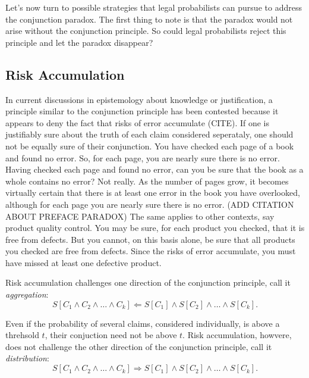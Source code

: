 \documentclass[10pt,dvipsnames,enabledeprecatedfontcommands]{scrartcl}
\begin{document}
Let's now turn to possible strategies that legal probabilists can pursue
to address the conjunction paradox. The first thing to note is that the
paradox would not arise without the conjunction principle. So could
legal probabilists reject this principle and let the paradox disappear?

\hypertarget{risk-accumulation}{%
\subsection{Risk Accumulation}\label{risk-accumulation}}

In current discussions in epistemology about knowledge or justification,
a principle similar to the conjunction principle has been contested
because it appears to deny the fact that risks of error accumulate
(CITE).
If one is justifiably sure about the truth of each claim considered
seperataly, one should not be equally sure of their conjunction. You
have checked each page of a book and found no error. So, for each page,
you are nearly sure there is no error. Having checked each page and
found no error, can you be sure that the book as a whole contains no
error? Not really. As the number of pages grow, it becomes virtually
certain that there is at least one error in the book you have
overlooked, although for each page you are nearly sure there is no
error. (ADD CITATION ABOUT PREFACE PARADOX) The same applies to other
contexts, say product quality control. You may be sure, for each product
you checked, that it is free from defects. But you cannot, on this basis
alone, be sure that all products you checked are free from defects.
Since the risks of error accumulate, you must have missed at least one
defective product.

Risk accumulation challenges one direction of the conjunction principle,
call it \textit{aggregation}:
\[S[C_1 \wedge C_2  \wedge \dots \wedge  C_k] \Leftarrow S[C_1] \wedge S[C_2]  \wedge \dots \wedge  S[C_k].\]

\noindent Even if the probability of several claims, considered
individually, is above a threhsold \(t\), their conjuction need not be
above \(t\). Risk accumulation, howvere, does not challenge the other
direction of the conjunction principle, call it \textit{distribution}:
\[S[C_1 \wedge C_2  \wedge \dots \wedge  C_k] \Rightarrow S[C_1] \wedge S[C_2]  \wedge \dots \wedge  S[C_k].\]
\end{document}
